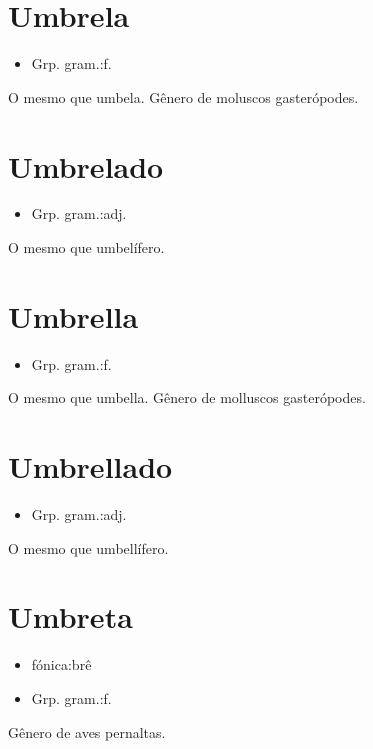 \documentclass{article}
\begin{document}
\section{Umbrela}
\begin{itemize}
\item {Grp. gram.:f.}
\end{itemize}
O mesmo que \textunderscore umbela\textunderscore .
Gênero de moluscos gasterópodes.
\section{Umbrelado}
\begin{itemize}
\item {Grp. gram.:adj.}
\end{itemize}
O mesmo que \textunderscore umbelífero\textunderscore .
\section{Umbrella}
\begin{itemize}
\item {Grp. gram.:f.}
\end{itemize}
O mesmo que \textunderscore umbella\textunderscore .
Gênero de molluscos gasterópodes.
\section{Umbrellado}
\begin{itemize}
\item {Grp. gram.:adj.}
\end{itemize}
O mesmo que \textunderscore umbellífero\textunderscore .
\section{Umbreta}
\begin{itemize}
\item {fónica:brê}
\end{itemize}
\begin{itemize}
\item {Grp. gram.:f.}
\end{itemize}
Gênero de aves pernaltas.
\end{document}
